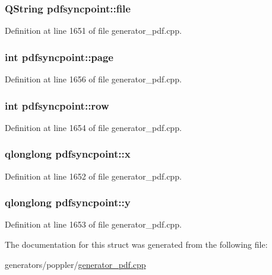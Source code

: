 \hypertarget{structpdfsyncpoint_adcfa7e4135135b0c4a3e7e5a8807ceeb}{
\subsubsection[{file}]{\setlength{\rightskip}{0pt plus 5cm}Q\+String pdfsyncpoint\+::file}}\label{structpdfsyncpoint_adcfa7e4135135b0c4a3e7e5a8807ceeb}


Definition at line 1651 of file generator\+\_\+pdf.\+cpp.

\hypertarget{structpdfsyncpoint_a38aa2f14b976bd9df900047205693e73}{
\subsubsection[{page}]{\setlength{\rightskip}{0pt plus 5cm}int pdfsyncpoint\+::page}}\label{structpdfsyncpoint_a38aa2f14b976bd9df900047205693e73}


Definition at line 1656 of file generator\+\_\+pdf.\+cpp.

\hypertarget{structpdfsyncpoint_a85d6f0001387e892225fab56ab806ac1}{
\subsubsection[{row}]{\setlength{\rightskip}{0pt plus 5cm}int pdfsyncpoint\+::row}}\label{structpdfsyncpoint_a85d6f0001387e892225fab56ab806ac1}


Definition at line 1654 of file generator\+\_\+pdf.\+cpp.

\hypertarget{structpdfsyncpoint_a42fa1214ad08ede751ccc0343b4b2928}{
\subsubsection[{x}]{\setlength{\rightskip}{0pt plus 5cm}qlonglong pdfsyncpoint\+::x}}\label{structpdfsyncpoint_a42fa1214ad08ede751ccc0343b4b2928}


Definition at line 1652 of file generator\+\_\+pdf.\+cpp.

\hypertarget{structpdfsyncpoint_ab480c3b2c0e9f41c3d2b90f615c35c5b}{
\subsubsection[{y}]{\setlength{\rightskip}{0pt plus 5cm}qlonglong pdfsyncpoint\+::y}}\label{structpdfsyncpoint_ab480c3b2c0e9f41c3d2b90f615c35c5b}


Definition at line 1653 of file generator\+\_\+pdf.\+cpp.



The documentation for this struct was generated from the following file\+:\begin{DoxyCompactItemize}
\item 
generators/poppler/\hyperlink{generator__pdf_8cpp}{generator\+\_\+pdf.\+cpp}\end{DoxyCompactItemize}

